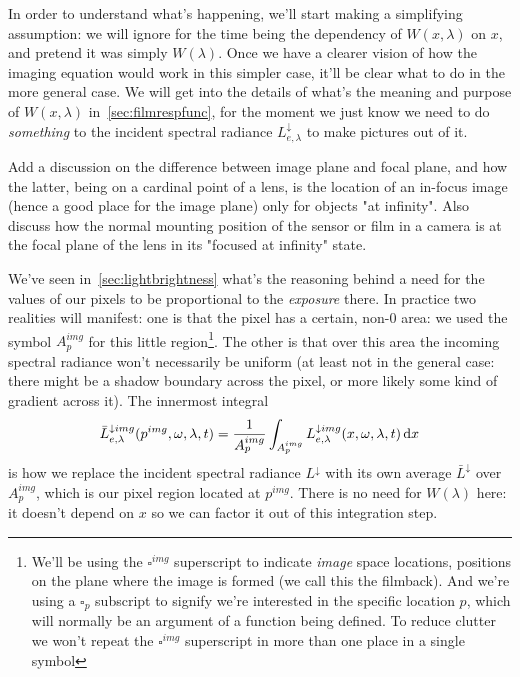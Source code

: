 
In order to understand what's happening, we'll start making a simplifying assumption:
we will ignore for the time being the dependency of $W(x,\lambda)$ on $x$, and 
pretend it was simply $W(\lambda)$. 
Once we have a clearer vision of how the imaging equation would work in this
simpler case, it'll be clear what to do in the more general case. 
We will get into the details of what's the meaning and purpose of $W(x,\lambda)$ 
in~\cref{sec:filmrespfunc}, for the moment we just know we need to do 
\emph{something} to the incident \gls{spectral} \gls{radiance} $L^{\downarrow}_{e,\lambda}$ to make
pictures out of it.

\begin{inconstruction}
	Add a discussion on the difference between image plane and focal plane, and how the latter,
	being on a cardinal point of a lens, is the location of an in-focus image (hence a good place
	for the image plane) only for objects "at infinity". Also discuss how the normal mounting position
	of the sensor or film in a camera is at the focal plane of the lens in its "focused at infinity"
	state.
\end{inconstruction}

We've seen in~\cref{sec:lightbrightness} what's the reasoning behind a need for the values 
of our pixels to be proportional to the \textsl{ \gls{exposure}} there. 
In practice two realities will manifest: one is that the pixel has a certain, 
non-$0$ area: we used the symbol $A^{img}_p$ for this little region\footnote{
	We'll be using the $\square^{img}$ superscript to indicate \textsl{\gls{image}} space 
	locations, positions on the plane where the image is formed (we call this 
	the \gls{filmback}). And we're using a $\square_p$ subscript to signify we're 
	interested in the specific location $p$, which will normally be an argument of a 
	function being defined. To reduce clutter we won't repeat the $\square^{img}$ 
	superscript in more than one place in a single symbol}. 
The other is that over this area the incoming \gls{spectral} 
\gls{radiance} won't necessarily be uniform (at least not in the general case: 
there might be a shadow boundary across the pixel, or more likely some kind of 
gradient across it). 
The innermost integral
\begin{displaymath}
	\bar L^{\downarrow img}_{e,\lambda}(p^{img}, \omega, \lambda, t) = \frac1{A_p^{img}} \int_{A_p^{img}} L^{\downarrow img}_{e,\lambda}(x, \omega, \lambda, t) \mathop{}\!\mathrm{d} x
\end{displaymath}
is how we replace the incident \gls{spectral} \gls{radiance} $L^{\downarrow}$ with 
its own average $\bar L^{\downarrow}$ over $A^{img}_p$, which is our pixel region located at $p^{img}$. 
There is no need for $W(\lambda)$ here: it doesn't depend on $x$ so we can factor it 
out of this integration step.

